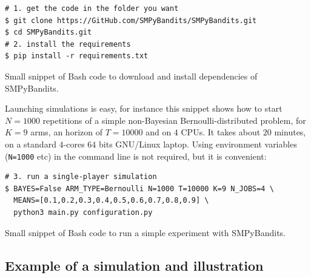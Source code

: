 \begin{small}
    \begin{listing}[h!]
        \begin{verbatim}
# 1. get the code in the folder you want
$ git clone https://GitHub.com/SMPyBandits/SMPyBandits.git
$ cd SMPyBandits.git
# 2. install the requirements
$ pip install -r requirements.txt
        \end{verbatim}
        \caption{Small snippet of Bash code to download and install dependencies of SMPyBandits.}
        \label{lst:3:howToInstallLibrary}
    \end{listing}
\end{small}

Launching simulations is easy, for instance this snippet shows how to start $N=1000$ repetitions of a simple non-Bayesian Bernoulli-distributed problem, for $K=9$ arms, an horizon of $T=10000$ and on $4$ CPUs.
It takes about $20$ minutes, on a standard $4$-cores $64$ bits GNU/Linux laptop.
Using environment variables (\texttt{N=1000} etc) in the command line is not required, but it is convenient:

\begin{small}
\begin{listing}[h!]
    \begin{verbatim}
# 3. run a single-player simulation
$ BAYES=False ARM_TYPE=Bernoulli N=1000 T=10000 K=9 N_JOBS=4 \
  MEANS=[0.1,0.2,0.3,0.4,0.5,0.6,0.7,0.8,0.9] \
  python3 main.py configuration.py
    \end{verbatim}
    \caption{Small snippet of Bash code to run a simple experiment with SMPyBandits.}
    \label{lst:3:howToRunBasicLibrary}
\end{listing}
\end{small}


\subsection{Example of a simulation and illustration}

